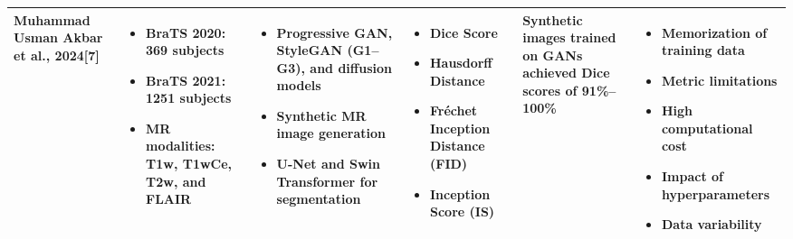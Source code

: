 \documentclass[12pt]{article}
\begin{document}
\begin{longtable}{|>{\RaggedRight}p{2.5cm}|>{\RaggedRight}p{2.8cm}|>{\RaggedRight}p{4cm}|>{\RaggedRight}p{2.8cm}|>{\RaggedRight}p{3.2cm}|>{\RaggedRight}p{3.5cm}|}
Muhammad Usman Akbar et al., 2024[7] & 
\begin{itemize}[leftmargin=8pt, itemsep=1pt, parsep=0pt]
\item BraTS 2020: 369 subjects
\item BraTS 2021: 1251 subjects
\item MR modalities: T1w, T1wCe, T2w, and FLAIR
\end{itemize} & 
\begin{itemize}[leftmargin=8pt, itemsep=1pt, parsep=0pt]
\item Progressive GAN, StyleGAN (G1--G3), and diffusion models
\item Synthetic MR image generation
\item U-Net and Swin Transformer for segmentation
\end{itemize} & 
\begin{itemize}[leftmargin=8pt, itemsep=1pt, parsep=0pt]
\item Dice Score
\item Hausdorff Distance
\item Fréchet Inception Distance (FID)
\item Inception Score (IS)
\end{itemize} & 
Synthetic images trained on GANs achieved Dice scores of 91\%--100\% & 
\begin{itemize}[leftmargin=8pt, itemsep=1pt, parsep=0pt]
\item Memorization of training data
\item Metric limitations
\item High computational cost
\item Impact of hyperparameters
\item Data variability
\end{itemize} \\
\hline


\end{longtable}
\end{document}
